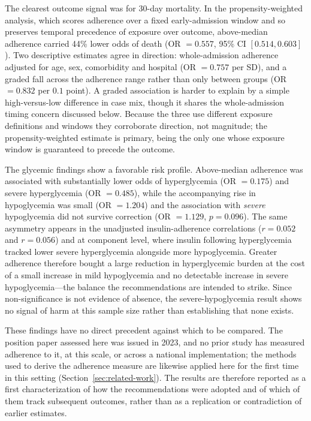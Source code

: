 The clearest outcome signal was for 30-day mortality. In the
propensity-weighted analysis, which scores adherence over a fixed
early-admission window and so preserves temporal precedence of exposure over
outcome, above-median adherence carried 44\% lower odds of death
(OR $=0.557$, 95\% CI $[0.514, 0.603]$). Two descriptive estimates agree in
direction: whole-admission adherence adjusted for age, sex, comorbidity and
hospital (OR $=0.757$ per SD), and a graded fall across the adherence range
rather than only between groups (OR $=0.832$ per $0.1$ point). A graded
association is harder to explain by a simple high-versus-low difference in
case mix, though it shares the whole-admission timing concern discussed
below. Because the three use different exposure definitions and windows they
corroborate direction, not magnitude; the propensity-weighted estimate is
primary, being the only one whose exposure window is guaranteed to precede
the outcome.

The glycemic findings show a favorable risk profile. Above-median adherence
was associated with substantially lower odds of hyperglycemia (OR $=0.175$)
and severe hyperglycemia (OR $=0.485$), while the accompanying rise in
hypoglycemia was small (OR $=1.204$) and the association with \emph{severe}
hypoglycemia did not survive correction (OR $=1.129$, $p=0.096$). The same
asymmetry appears in the unadjusted insulin-adherence correlations
($r=0.052$ and $r=0.056$) and at component level, where insulin following
hyperglycemia tracked lower severe hyperglycemia alongside more
hypoglycemia. Greater adherence therefore bought a large reduction in
hyperglycemic burden at the cost of a small increase in mild hypoglycemia
and no detectable increase in severe hypoglycemia---the balance the
recommendations are intended to strike. Since non-significance is not
evidence of absence, the severe-hypoglycemia result shows no signal of harm
at this sample size rather than establishing that none exists.

These findings have no direct precedent against which to be compared. The
position paper assessed here was issued in 2023, and no prior study has
measured adherence to it, at this scale, or across a national
implementation; the methods used to derive the adherence measure are
likewise applied here for the first time in this setting
(Section~\ref{sec:related-work}). The results are therefore reported as a
first characterization of how the recommendations were adopted and of which
of them track subsequent outcomes, rather than as a replication or
contradiction of earlier estimates.

